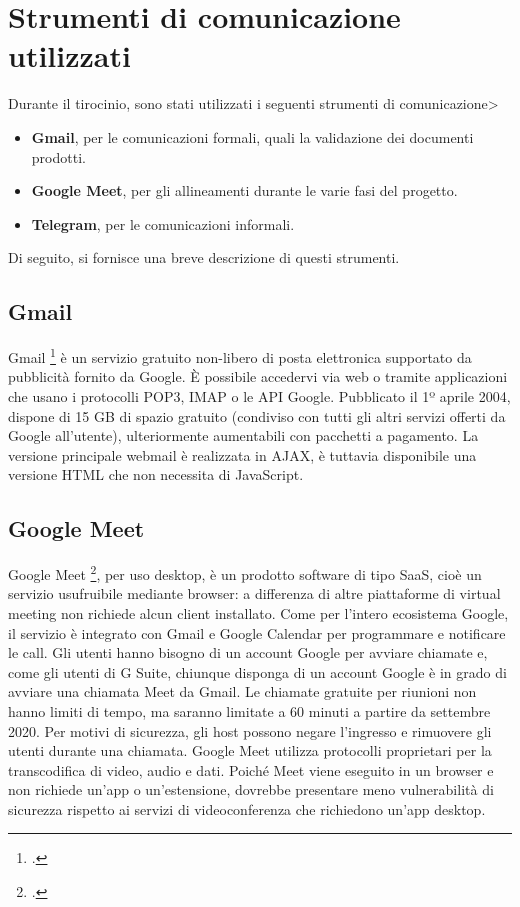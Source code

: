 \section{Strumenti di comunicazione utilizzati}

Durante il tirocinio, sono stati utilizzati i seguenti strumenti di comunicazione>
\begin{itemize}
    \item \textbf{Gmail}, per le comunicazioni formali, quali la validazione dei documenti prodotti.
    \item \textbf{Google Meet}, per gli allineamenti durante le varie fasi del progetto.
    \item \textbf{Telegram}, per le comunicazioni informali.
\end{itemize}

Di seguito, si fornisce una breve descrizione di questi strumenti.

\subsection{Gmail}
Gmail \footcite{site:gmail} è un servizio gratuito non-libero di posta elettronica supportato da pubblicità fornito da Google. 
È possibile accedervi via web o tramite applicazioni che usano i protocolli POP3, IMAP o le API Google.
Pubblicato il 1º aprile 2004, dispone di 15 GB di spazio gratuito (condiviso con tutti gli altri servizi offerti da Google all'utente), ulteriormente aumentabili con pacchetti a pagamento. 
La versione principale webmail è realizzata in AJAX, è tuttavia disponibile una versione HTML che non necessita di JavaScript.
\subsection{Google Meet}
Google Meet \footcite{site:meet}, per uso desktop, è un prodotto software di tipo SaaS, cioè un servizio usufruibile mediante browser: a differenza di altre piattaforme di virtual meeting non richiede alcun client installato. 
Come per l'intero ecosistema Google, il servizio è integrato con Gmail e Google Calendar per programmare e notificare le call.
Gli utenti hanno bisogno di un account Google per avviare chiamate e, come gli utenti di G Suite, chiunque disponga di un account Google è in grado di avviare una chiamata Meet da Gmail.
Le chiamate gratuite per riunioni non hanno limiti di tempo, ma saranno limitate a 60 minuti a partire da settembre 2020. 
Per motivi di sicurezza, gli host possono negare l'ingresso e rimuovere gli utenti durante una chiamata.
Google Meet utilizza protocolli proprietari per la transcodifica di video, audio e dati. 
Poiché Meet viene eseguito in un browser e non richiede un'app o un'estensione, dovrebbe presentare meno vulnerabilità di sicurezza rispetto ai servizi di videoconferenza che richiedono un'app desktop.
